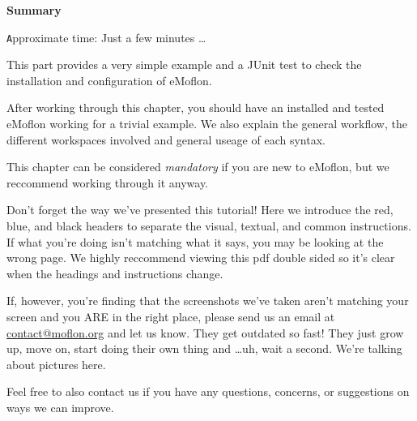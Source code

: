 \vspace*{2cm}

{\Huge \bfseries Summary}
\vspace{0.5cm}

{\small \texttt Approximate time: Just a few minutes \ldots}

This part provides a very simple example and a JUnit test to check the installation and configuration of eMoflon.

After working through this chapter, you should have an installed and tested eMoflon working for a trivial example.
We also explain the general workflow, the different workspaces involved and general useage of each syntax.

This chapter can be considered \emph{mandatory} if you are new to eMoflon, but we reccommend working through it anyway.

Don't forget the way we've presented this tutorial! Here we introduce the red, blue, and black headers to separate the visual, textual, and common instructions. 
If what you're doing isn't matching what it says, you may be looking at the wrong page. We highly reccommend viewing this pdf double sided so it's clear when the headings and instructions change.

If, however, you're finding that the screenshots we've taken aren't matching your screen and you ARE in the right place, please send us an email at \href{mailto:contact@moflon.org}{contact@moflon.org} and let us know. They get outdated so fast! They just grow up, move on, start doing their own thing and \ldots uh, wait a second. We're talking about pictures here.

Feel free to also contact us if you have any questions, concerns, or suggestions on ways we can improve.